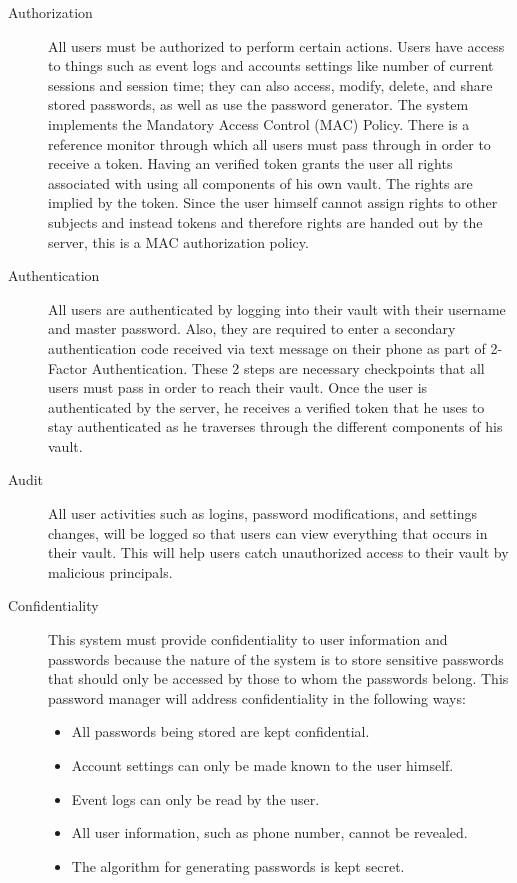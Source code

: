 \documentclass{article}
\begin{document}
\begin{description}
  \item[Authorization] All users must be authorized to perform certain actions. Users have access to things such as event logs and accounts settings like number of current sessions and session time; they can also access, modify, delete, and share stored passwords, as well as use the password generator. The system implements the Mandatory Access Control (MAC) Policy. There is a reference monitor through which all users must pass through in order to receive a token. Having an verified token grants the user all rights associated with using all components of his own vault. The rights are implied by the token. Since the user himself cannot assign rights to other subjects and instead tokens and therefore rights are handed out by the server, this is a MAC authorization policy.
  \item[Authentication] All users are authenticated by logging into their vault with their username and master password. Also, they are required to enter a secondary authentication code received via text message on their phone as part of 2-Factor Authentication. These 2 steps are necessary checkpoints that all users must pass in order to reach their vault. Once the user is authenticated by the server, he receives a verified token that he uses to stay authenticated as he traverses through the different components of his vault.
  \item[Audit] All user activities such as logins, password modifications, and settings changes, will be logged so that users can view everything that occurs in their vault. This will help users catch unauthorized access to their vault by malicious principals.
  \item[Confidentiality] This system must provide confidentiality to user information and passwords because the nature of the system is to store sensitive passwords that should only be accessed by those to whom the passwords belong. This password manager will address confidentiality in the following ways: \begin{itemize}
    \item All passwords being stored are kept confidential.
    \item Account settings can only be made known to the user himself.
    \item Event logs can only be read by the user.
    \item All user information, such as phone number, cannot be revealed.
    \item The algorithm for generating passwords is kept secret.

\end{itemize}
\end{description}
\end{document}
